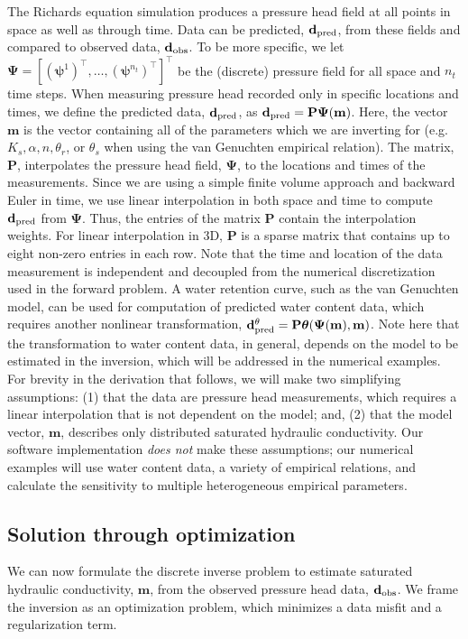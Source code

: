 \documentclass[preprint,review,3p,times,onecolumn,authoryear]{elsarticle}
\newcommand{\bfP}{\mathbf{P}}
\newcommand{\bfm}{\mathbf{m}}
\newcommand{\bftheta}{\boldsymbol{\theta}}
\newcommand{\bfpsi}{\boldsymbol{\psi}}
\newcommand{\bfPsi}{\boldsymbol{\Psi}}
\newcommand{\bfdo}{\mathbf{d}_{\rm obs}}
\newcommand{\bfdp}{\mathbf{d}_{\rm pred}}
\begin{document}
The Richards equation simulation produces a pressure head field at all points in space as well as through time. Data can be predicted, $\bfdp$, from these fields and compared to observed data, $\bfdo$. To be more specific, we let $\bfPsi = [(\bfpsi^{1})^{\top},\ldots,(\bfpsi^{n_{t}})^{\top}]^{\top}$ be the (discrete) pressure field for all space and $n_{t}$ time steps. When measuring pressure head recorded only in specific locations and times, we define the predicted data, $\bfdp$, as $\bfdp = \bfP \bfPsi(\bfm)$. Here, the vector $\mathbf{m}$ is the vector containing all of the parameters which we are inverting for (e.g. $K_s, \alpha, n, \theta_r$, or $\theta_s$ when using the van Genuchten empirical relation). The matrix, $\bfP$, interpolates the pressure head field, $\bfPsi$, to the locations and times of the measurements. Since we are using a simple finite volume approach and backward Euler in time, we use linear interpolation in both space and time to compute $\bfdp$ from $\bfPsi$. Thus, the entries of the matrix $\bfP$ contain the interpolation weights. For linear interpolation in 3D, $\bfP$ is a sparse matrix that contains up to eight non-zero entries in each row. Note that the time and location of the data measurement is independent and decoupled from the numerical discretization used in the forward problem. A water retention curve, such as the van Genuchten model, can be used for computation of predicted water content data, which requires another nonlinear transformation, $\bfdp^\theta = \bfP \bftheta(\bfPsi(\bfm), \bfm)$. Note here that the transformation to water content data, in general, depends on the model to be estimated in the inversion, which will be addressed in the numerical examples. For brevity in the derivation that follows, we will make two simplifying assumptions: (1) that the data are pressure head measurements, which requires a linear interpolation that is not dependent on the model; and, (2) that the model vector, $\bfm$, describes only distributed saturated hydraulic conductivity. Our software implementation \emph{does not} make these assumptions; our numerical examples will use water content data, a variety of empirical relations, and calculate the sensitivity to multiple heterogeneous empirical parameters.

\subsection{Solution through optimization}
We can now formulate the discrete inverse problem to estimate saturated hydraulic conductivity, $\bfm$, from the observed pressure head data, $\bfdo$. We frame the inversion as an optimization problem, which minimizes a data misfit and a regularization term.
\end{document}
